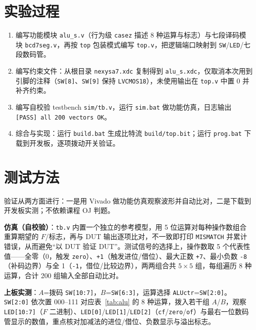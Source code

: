 \documentclass[12pt, a4paper]{ctexart}
\begin{document}
\section{实验过程}
\begin{enumerate}
    \item 编写功能模块 \texttt{alu\_s.v}（行为级 \texttt{casez} 描述 8 种运算与标志）与七段译码模块 \texttt{bcd7seg.v}，再按 \texttt{top} 包装模式编写 \texttt{top.v}，把逻辑端口映射到 \texttt{SW}/\texttt{LED}/七段数码管。
    \item 编写约束文件：从根目录 \texttt{nexysa7.xdc} 复制得到 \texttt{alu\_s.xdc}，仅取消本次用到引脚的注释（\texttt{SW[8]}、\texttt{SW[9]} 保持 \texttt{LVCMOS18}），未使用输出在 \texttt{top.v} 中置 0 并补齐约束。
    \item 编写自校验 testbench \texttt{sim/tb.v}，运行 \texttt{sim.bat} 做功能仿真，日志输出 \texttt{[PASS] all 200 vectors OK}。
    \item 综合与实现：运行 \texttt{build.bat} 生成比特流 \texttt{build/top.bit}；运行 \texttt{prog.bat} 下载到开发板，逐项拨动开关验证。
\end{enumerate}


\section{测试方法}
验证从两方面进行：一是用 Vivado 做功能仿真观察波形并自动比对，二是下载到开发板实测；不依赖课程 OJ 判题。

\textbf{仿真（自校验）}：\texttt{tb.v} 内置一个独立的参考模型，用 5 位运算对每种操作数组合重算期望的 $F$/标志，再与 DUT 输出逐项比对，不一致即打印 \texttt{MISMATCH} 并累计错误，从而避免``以 DUT 验证 DUT''。测试信号的选择上，操作数取 5 个代表性值——全零（0，触发 \texttt{zero}）、\texttt{+1}（触发进位/借位）、最大正数 \texttt{+7}、最小负数 \texttt{-8}（补码边界）与全 1（\texttt{-1}，借位/比较边界），两两组合共 $5\times5$ 组，每组遍历 8 种运算，合计 200 组输入全部自动比对。

\textbf{上板实测}：$A$=拨码 \texttt{SW[10:7]}，$B$=\texttt{SW[6:3]}，运算选择 \texttt{ALUctr}=\texttt{SW[2:0]}。\texttt{SW[2:0]} 依次置 000--111 对应表~\ref{tab:alu} 的 8 种运算，拨入若干组 $A$/$B$，观察 \texttt{LED[10:7]}（$F$ 二进制）、\texttt{LED[0]}/\texttt{LED[1]}/\texttt{LED[2]}（\texttt{cf}/\texttt{zero}/\texttt{of}）与最右一位数码管显示的数值，重点核对加减法的进位/借位、负数显示与溢出标志。
\end{document}

